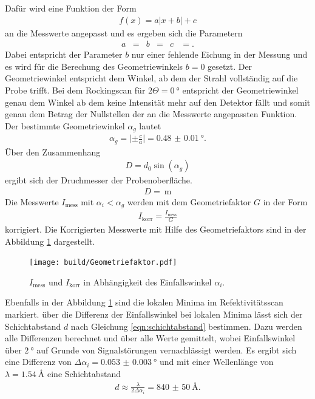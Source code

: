Dafür wird eine Funktion der Form
\begin{align}
  f(x) = a \lvert x + b \rvert + c
\end{align}
an die Messwerte angepasst und es ergeben sich die Parametern
\begin{align}
a&= &b&=  &c&=.
\end{align}
Dabei entspricht der Parameter $b$ nur einer fehlende Eichung in der Messung und
es wird für die Berechung des Geometriewinkels $b=0$ gesetzt.
Der Geometriewinkel entspricht dem Winkel, ab dem der Strahl
vollständig auf die Probe trifft. Bei dem Rockingscan für $2\Theta=\SI{0}{\degree}$
entspricht der Geometriewinkel genau dem Winkel ab dem keine Intensität
mehr auf den Detektor fällt und somit genau dem Betrag der Nullstellen der an die Messwerte
angepassten Funktion.
Der bestimmte Geometriewinkel $\alpha_g$
lautet
\begin{align}
\alpha_g = \lvert \pm\frac{c}{a} \rvert = \SI{0.48(1)}{\degree}.
\end{align}
Über den Zusammenhang
\begin{align}
D = d_0\sin(\alpha_g)
\end{align}
ergibt sich der Druchmesser
der Probenoberfläche.
\begin{align}
  D=\SI{}{\meter}
\end{align}
Die Messwerte $I_{\mathrm{mess}}$ mit $\alpha_i < \alpha_g $ werden mit dem Geometriefaktor $G$
in der Form
\begin{align}
  I_{\mathrm{korr}} = \frac{I_{\mathrm{mess}}}{G}
\end{align}
korrigiert. Die Korrigierten Messwerte mit Hilfe des Geometriefaktors sind in der Abbildung \ref{fig:korr} dargestellt.
\begin{figure}
  \centering
  \texttt{[image: build/Geometriefaktor.pdf]}
  \caption{$I_{\mathrm{mess}}$ und $I_{\mathrm{korr}}$ in Abhängigkeit des Einfallswinkel $\alpha_i$.}
  \label{fig:korr}
\end{figure}

Ebenfalls in der Abbildung \ref{fig:korr}
sind die lokalen Minima im Refektivitätsscan markiert.
über die Differenz der Einfallswinkel bei lokalen Minima lässt
sich der Schichtabstand $d$ nach Gleichung \eqref{eqn:schichtabstand}
bestimmen.
Dazu werden alle Differenzen
berechnet und über alle Werte gemittelt, wobei Einfallswinkel
über $\SI{2}{\degree}$ auf Grunde von Signalstörungen vernachlässigt werden.
Es ergibt sich eine Differenz von $\Delta \alpha_i = \SI{0.053(3)}{\degree}$
und mit einer Wellenlänge von $\lambda=\SI{1.54}{\angstrom}$
eine Schichtabstand
\begin{align}
d \approx \frac{\lambda}{2\Delta\alpha_i} = \SI{840(50)}{\angstrom}.
\end{align}





%
